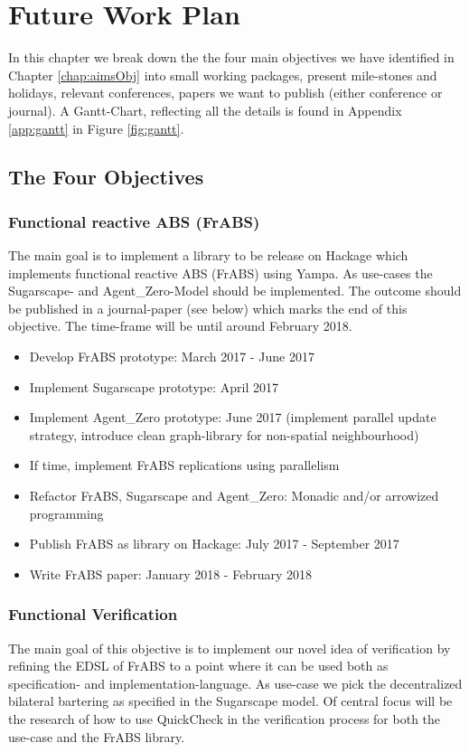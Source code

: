 \chapter{Future Work Plan}
\label{chap:future}


In this chapter we break down the the four main objectives we have identified in Chapter \ref{chap:aimsObj} into small working packages, present mile-stones and holidays, relevant conferences, papers we want to publish (either conference or journal). A Gantt-Chart, reflecting all the details is found in Appendix \ref{app:gantt} in Figure \ref{fig:gantt}.

\section{The Four Objectives}
\subsection{Functional reactive ABS (FrABS)}
The main goal is to implement a library to be release on Hackage which implements functional reactive ABS (FrABS) using Yampa. As use-cases the Sugarscape- and Agent\_Zero-Model should be implemented. The outcome should be published in a journal-paper (see below) which marks the end of this objective. The time-frame will be until around February 2018.

\begin{itemize}
\item Develop FrABS prototype: March 2017 - June 2017
\item Implement Sugarscape prototype: April 2017
\item Implement Agent\_Zero prototype: June 2017 (implement parallel update strategy, introduce clean graph-library for non-spatial neighbourhood)
\item If time, implement FrABS replications using parallelism
\item Refactor FrABS, Sugarscape and Agent\_Zero: Monadic and/or arrowized programming
\item Publish FrABS as library on Hackage: July 2017 - September 2017
\item Write FrABS paper: January 2018 - February 2018
\end{itemize}

\subsection{Functional Verification}
The main goal of this objective is to implement our novel idea of verification by refining the EDSL of FrABS to a point where it can be used both as specification- and implementation-language. As use-case we pick the decentralized bilateral bartering as specified in the Sugarscape model. Of central focus will be the research of how to use QuickCheck in the verification process for both the use-case and the FrABS library.

